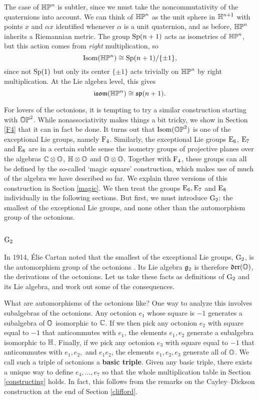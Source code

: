 The case of ${\mathbb {HP}}^n$ is subtler, since we must take the noncommutativity
of the quaternions into account.   We can think of ${\mathbb {HP}}^n$ as the unit
sphere in ${\mathbb H}^{n+1}$ with points $x$ and $\alpha x$ identified whenever
$\alpha$ is a unit quaternion, and as before, ${\mathbb {HP}}^n$ inherits a
Riemannian metric.  The group ${\rm Sp}(n+1)$ acts as isometries of ${\mathbb {HP}}^n$,
but this action comes from {\it right} multiplication, so 
\[       {\rm Isom}({\mathbb {HP}}^n) \cong {\rm Sp}(n+1)/\{ \pm 1 \},  \]
since not ${\rm Sp}(1)$ but only its center $\{\pm 1\}$ acts trivially
on ${\mathbb {HP}}^n$ by right multiplication.  At the Lie algebra level, this 
gives
\[       {\mathfrak {isom}}({\mathbb {HP}}^n) \cong {\mathfrak {sp}}(n+1) . \]

For lovers of the octonions, it is tempting to try a similar
construction starting with ${\mathbb {OP}}^2$.  While nonassociativity makes things
a bit tricky, we show in Section \ref{F4} that it can in fact be done. 
It turns out that ${\rm Isom}({\mathbb {OP}}^2)$ is one of the exceptional Lie groups,
namely ${\rm F}_4$.  Similarly, the exceptional Lie groups ${\rm E}_6$, ${\rm E}_7$
and ${\rm E}_8$ are in a certain subtle sense the isometry groups of
projective planes over the algebras ${\mathbb C} \otimes {\mathbb O}$, ${\mathbb H} \otimes {\mathbb O}$ and
${\mathbb O} \otimes {\mathbb O}$.  Together with ${\rm F}_4$, these groups can all be 
defined by the so-called `magic square' construction, which makes use of
much of the algebra we have described so far.  We explain three versions
of this construction in Section \ref{magic}.  We then treat the groups
${\rm E}_6, {\rm E}_7$ and ${\rm E}_8$ individually in the following sections.  But
first, we must introduce ${\rm G}_2$: the smallest of the exceptional Lie
groups, and none other than the automorphism group of the octonions.

\subsection{${\rm G}_2$}       \label{G2}   
 
In 1914, \'Elie Cartan noted that the smallest of the exceptional Lie 
groups, ${\rm G}_2$, is the automorphism group of the octonions 
\cite{Cartan}.  Its Lie algebra ${\mathfrak {g}}_2$ is therefore ${\mathfrak {der}}({\mathbb O})$, the 
derivations of the octonions.  Let us take these facts as definitions of 
${\rm G}_2$ and its Lie algebra, and work out some of the consequences.   
   
What are automorphisms of the octonions like?  One way to analyze this
involves subalgebras of the octonions.  Any octonion $e_1$ whose square
is $-1$ generates a subalgebra of ${\mathbb O}$ isomorphic to ${\mathbb C}$. If we then
pick any octonion $e_2$ with square equal to $-1$ that anticommutes with
$e_1$, the elements $e_1,e_2$ generate a subalgebra isomorphic to ${\mathbb H}$.
Finally, if we pick any octonion $e_3$ with square equal to $-1$ that
anticommutes with $e_1,e_2,$ and $e_1e_2$, the elements $e_1,e_2,e_3$
generate all of ${\mathbb O}$.  We call such a triple of octonions a {\bf basic
triple}.  Given any basic triple, there exists a unique way to define
$e_4, \dots , e_7$ so that the whole multiplication table in Section
\ref{constructing} holds.  In fact, this follows from the remarks on the
Cayley--Dickson construction at the end of Section \ref{clifford}.
   
